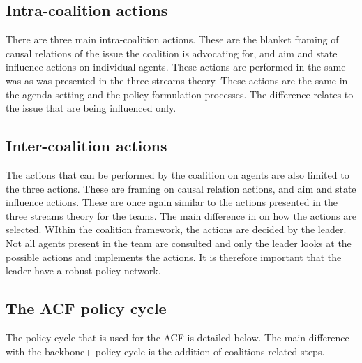 \subsection{Intra-coalition actions}


There are three main intra-coalition actions. These are the blanket framing of causal relations of the issue the coalition is advocating for, and aim and state influence actions on individual agents. These actions are performed in the same was as was presented in the three streams theory. These actions are the same in the agenda setting and the policy formulation processes. The difference relates to the issue that are being influenced only.


\subsection{Inter-coalition actions}


The actions that can be performed by the coalition on agents are also limited to the three actions. These are framing on causal relation actions, and aim and state influence actions. These are once again similar to the actions presented in the three streams theory for the teams. The main difference in on how the actions are selected. WIthin the coalition framework, the actions are decided by the leader. Not all agents present in the team are consulted and only the leader looks at the possible actions and implements the actions. It is therefore important that the leader have a robust policy network. 


\subsection{The ACF policy cycle}


The policy cycle that is used for the ACF is detailed below. The main difference with the backbone+ policy cycle is the addition of coalitions-related steps.


